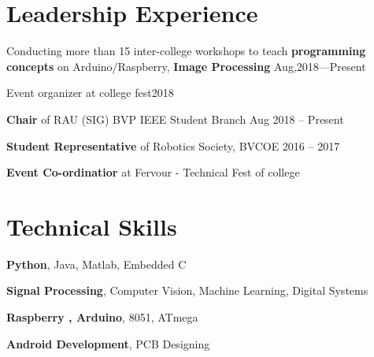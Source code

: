 \halfblankline

\section{Leadership Experience}
\begin{innerlist}
\item Conducting more than 15 inter-college workshops to teach \textbf{programming concepts} on Arduino/Raspberry, \textbf{Image Processing} \hfill {Aug,2018---Present}
    \item Event organizer at college fest\hfill {2018}
    \item \textbf{Chair} of RAU (SIG) BVP IEEE Student Branch \hfill {Aug 2018 -- Present}
    \item \textbf{Student Representative} of Robotics Society, BVCOE \hfill {2016 -- 2017}
    
    \item \textbf{Event Co-ordinatior} at Fervour - Technical Fest of college 
\end{innerlist}

\halfblankline


\halfblankline

\section{Technical Skills}
\begin{innerlist}
    \item \textbf{Python}, Java, Matlab, Embedded C
    \item \textbf{Signal Processing}, Computer Vision, Machine Learning, Digital Systems
    \item \textbf{Raspberry , Arduino}, 8051, ATmega
    \item \textbf{Android Development}, PCB Designing 
\end{innerlist}

\halfblankline



